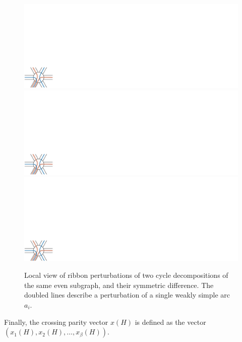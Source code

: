 \documentclass[letterpaper,review]{siamart190516}
\begin{document}
\begin{figure}[htb]
\centering
\includegraphics[scale=0.5,page=1]{Fig/cycle-decomp-independence}\qquad
\includegraphics[scale=0.5,page=2]{Fig/cycle-decomp-independence}\qquad
\includegraphics[scale=0.5,page=3]{Fig/cycle-decomp-independence}
\caption{Local view of ribbon perturbations of two cycle decompositions of the same even subgraph, and their symmetric difference.  The doubled lines describe a perturbation of a single weakly simple arc $a_i$.}
\label{F:cycle-decomp}
\end{figure}

Finally, the crossing parity vector $x(H)$ is defined as the vector $(x_1(H), x_2(H), \dots, x_\beta(H))$.
\end{document}
